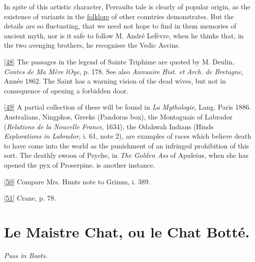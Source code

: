 \documentclass[14pt,a4paper]{memoir}
\newcommand{\ul}[1]{\uline{#1}}
\begin{document}
In spite of this artistic character, Perrault\textquotesingle s tale is
clearly of popular origin, as the existence of variants in the
\ul{folklore} of other countries demonstrates. But the details are so
fluctuating, that we need not hope to find in them memories of ancient
myth, nor is it safe to follow M. André Lefèvre, when he thinks that, in
the two avenging brothers, he recognises the Vedic Asvins.

\protect\hypertarget{4533318093929944247_33931-h-0.htm.xhtmlux5cux23Footnote_48}{}{}\protect\hyperlink{4533318093929944247_33931-h-0.htm.xhtmlux5cux23FNanchor_48}{{{[}48{]}}}
The passages in the legend of Sainte Triphime are quoted by M. Deulin,
\emph{Contes de Ma Mère l\textquotesingle Oye}, p. 178. See also
\emph{Annuaire Hist. et Arch. de Bretagne}, Année 1862. The Saint has a
warning vision of the dead wives, but not in consequence of opening a
forbidden door.

\protect\hypertarget{4533318093929944247_33931-h-0.htm.xhtmlux5cux23Footnote_49}{}{}\protect\hyperlink{4533318093929944247_33931-h-0.htm.xhtmlux5cux23FNanchor_49}{{{[}49{]}}}
A partial collection of these will be found in \emph{La Mythologie},
Lang. Paris 1886. Australians, Ningphos, Greeks
(Pandora\textquotesingle s box), the Montaguais of Labrador
(\emph{Relations de la Nouvelle France}, 1634), the Odahwah Indians
(Hind\textquotesingle s \emph{Explorations in Labrador}, i. 61, note 2),
are examples of races which believe death to have come into the world as
the punishment of an infringed prohibition of this sort. The deathly
swoon of Psyche, in \emph{The Golden Ass} of Apuleius, when she has
opened the pyx of Proserpine, is another instance.

\protect\hypertarget{4533318093929944247_33931-h-0.htm.xhtmlux5cux23Footnote_50}{}{}\protect\hyperlink{4533318093929944247_33931-h-0.htm.xhtmlux5cux23FNanchor_50}{{{[}50{]}}}
Compare Mrs. Hunt\textquotesingle s note to Grimm, i. 389.

\protect\hypertarget{4533318093929944247_33931-h-0.htm.xhtmlux5cux23Footnote_51}{}{}\protect\hyperlink{4533318093929944247_33931-h-0.htm.xhtmlux5cux23FNanchor_51}{{{[}51{]}}}
Crane, p. 78.

\section{Le Maistre Chat, ou le Chat Botté.}

\emph{Puss in Boots.} \\
\end{document}
